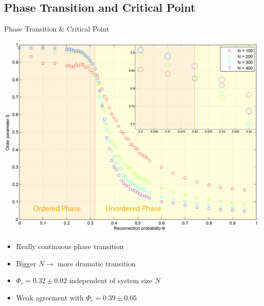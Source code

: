 \documentclass[xcolor=x11names,compress]{beamer}
\renewcommand{\(}{\begin{columns}}
\renewcommand{\)}{\end{columns}}
\newcommand{\<}[1]{\begin{column}{#1}}
\renewcommand{\>}{\end{column}}
\begin{document}

\subsection{Phase Transition and Critical Point}

\begin{frame}{Phase Transition \& Critical Point}

\begin{center}
\includegraphics[scale=0.35]{Graphics/SvsPHI_combined.pdf}
\end{center}

\begin{itemize}
\item Really continuous phase transition
\item Bigger $N \rightarrow$ more dramatic transition
\item $\Phi_c = 0.32 \pm 0.02$ independent of system size $N$
\item Weak agreement with $\Phi_c = 0.39 \pm 0.05$
\end{itemize}

\end{frame}



\end{document}
